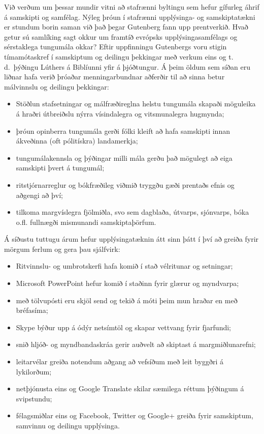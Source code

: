 \begin{multicols}{2}

Við verðum um þessar mundir vitni að stafrænni byltingu sem hefur gífurleg áhrif á samskipti og samfélag. Nýleg þróun í stafrænni upplýsinga- og samskiptatækni er stundum borin saman við það þegar Gutenberg fann upp prentverkið. Hvað getur sú samlíking sagt okkur um framtíð evrópsks upplýsingasamfélags og sérstaklega tungumála okkar?
Eftir uppfinningu Gutenbergs voru stigin tímamótaskref í samskiptum og deilingu þekkingar með verkum eins og t.\,d.~þýðingu Lúthers á Biblíunni yfir á þjóðtungur. Á þeim öldum sem síðan eru liðnar hafa verið þróaðar menningarbundnar aðferðir til að sinna betur málvinnslu og deilingu þekkingar:

\begin{itemize}
\item Stöðlun stafsetningar og málfræðireglna helstu tungumála skapaði möguleika á hraðri útbreiðslu nýrra vísindalegra og vitsmunalegra hugmynda;
\item þróun opinberra tungumála gerði fólki kleift að hafa samskipti innan ákveðinna (oft pólitískra) landamerkja;
\item tungumálakennsla og þýðingar milli mála gerðu það mögulegt að eiga samskipti þvert á tungumál;
\item ritstjórnarreglur og bókfræðileg viðmið tryggðu gæði prentaðs efnis og aðgengi að því;
\item tilkoma margvíslegra fjölmiðla, svo sem dagblaða, útvarps, sjónvarps, bóka o.fl. fullnægði mismunandi samskiptaþörfum.
\end{itemize}

Á síðustu tuttugu árum hefur upplýsingatæknin átt sinn þátt í því að greiða fyrir mörgum ferlum og gera þau sjálfvirk:

\begin{itemize}
\item Ritvinnslu- og umbrotskerfi hafa komið í stað vélritunar og setningar;
\item Microsoft PowerPoint hefur komið í staðinn fyrir glærur og myndvarpa;
\item með tölvupósti eru skjöl send og tekið á móti þeim mun hraðar en með bréfasíma;
\item Skype býður upp á ódýr netsímtöl og skapar vettvang fyrir fjarfundi;
\item snið hljóð- og myndbandaskráa gerir auðvelt að skiptast á margmiðlunarefni;
\item leitarvélar greiða notendum aðgang að vefsíðum með leit byggðri á lykilorðum;
\item netþjónusta eins og Google Translate skilar sæmilega réttum þýðingum á svipstundu;
\item félagsmiðlar eins og Facebook, Twitter og Google+ greiða fyrir samskiptum, samvinnu og deilingu upplýsinga. 
\end{itemize}


\end{multicols}
